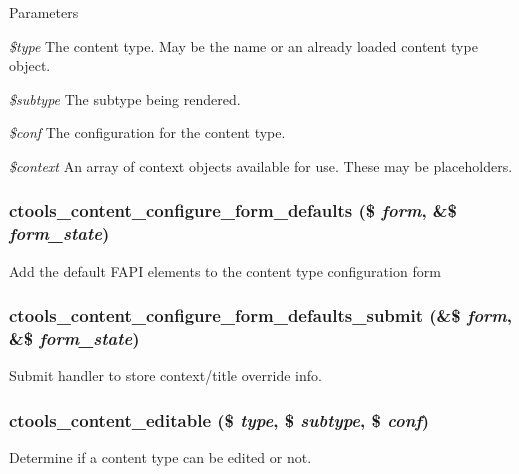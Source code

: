 \begin{DoxyParams}{Parameters}
\item[{\em \$type}]The content type. May be the name or an already loaded content type object. \item[{\em \$subtype}]The subtype being rendered. \item[{\em \$conf}]The configuration for the content type. \item[{\em \$context}]An array of context objects available for use. These may be placeholders. \end{DoxyParams}
\hypertarget{content_8inc_aa433fb0534a5179c0f00b556dd22b5b3}{
\subsubsection[{ctools\_\-content\_\-configure\_\-form\_\-defaults}]{\setlength{\rightskip}{0pt plus 5cm}ctools\_\-content\_\-configure\_\-form\_\-defaults (\$ {\em form}, \/  \&\$ {\em form\_\-state})}}
\label{content_8inc_aa433fb0534a5179c0f00b556dd22b5b3}
Add the default FAPI elements to the content type configuration form \hypertarget{content_8inc_af413cf9d35b010c5f527c1d2345c840c}{
\subsubsection[{ctools\_\-content\_\-configure\_\-form\_\-defaults\_\-submit}]{\setlength{\rightskip}{0pt plus 5cm}ctools\_\-content\_\-configure\_\-form\_\-defaults\_\-submit (\&\$ {\em form}, \/  \&\$ {\em form\_\-state})}}
\label{content_8inc_af413cf9d35b010c5f527c1d2345c840c}
Submit handler to store context/title override info. \hypertarget{content_8inc_ad7386957cafa4ac906da577b4f12ddfd}{
\subsubsection[{ctools\_\-content\_\-editable}]{\setlength{\rightskip}{0pt plus 5cm}ctools\_\-content\_\-editable (\$ {\em type}, \/  \$ {\em subtype}, \/  \$ {\em conf})}}
\label{content_8inc_ad7386957cafa4ac906da577b4f12ddfd}
Determine if a content type can be edited or not.

